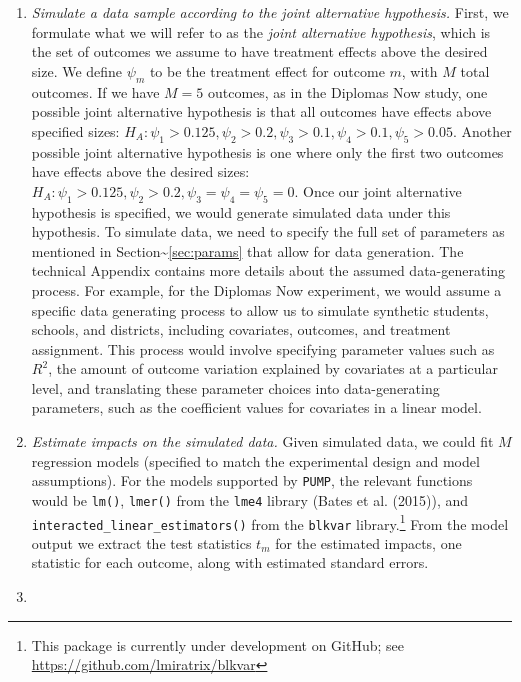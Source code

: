 \documentclass[
]{article}
\begin{document}
\begin{enumerate}
\def\labelenumi{\arabic{enumi}.}
\item
  \emph{Simulate a data sample according to the joint alternative
  hypothesis.} First, we formulate what we will refer to as the
  \emph{joint alternative hypothesis}, which is the set of outcomes we
  assume to have treatment effects above the desired size. We define
  \(\psi_m\) to be the treatment effect for outcome \(m\), with \(M\)
  total outcomes. If we have \(M = 5\) outcomes, as in the Diplomas Now
  study, one possible joint alternative hypothesis is that all outcomes
  have effects above specified sizes:
  \(H_A: \psi_1 > 0.125, \psi_2 > 0.2, \psi_3 > 0.1, \psi_4 > 0.1, \psi_5 > 0.05\).
  Another possible joint alternative hypothesis is one where only the
  first two outcomes have effects above the desired sizes:
  \(H_A: \psi_1 > 0.125, \psi_2 > 0.2, \psi_3 = \psi_4 = \psi_5 = 0\).
  Once our joint alternative hypothesis is specified, we would generate
  simulated data under this hypothesis. To simulate data, we need to
  specify the full set of parameters as mentioned in
  Section\textasciitilde{}\ref{sec:params} that allow for data
  generation. The technical Appendix contains more details about the
  assumed data-generating process. For example, for the Diplomas Now
  experiment, we would assume a specific data generating process to
  allow us to simulate synthetic students, schools, and districts,
  including covariates, outcomes, and treatment assignment. This process
  would involve specifying parameter values such as \(R^2\), the amount
  of outcome variation explained by covariates at a particular level,
  and translating these parameter choices into data-generating
  parameters, such as the coefficient values for covariates in a linear
  model.
\item
  \emph{Estimate impacts on the simulated data.} Given simulated data,
  we could fit \(M\) regression models (specified to match the
  experimental design and model assumptions). For the models supported
  by \texttt{PUMP}, the relevant functions would be \texttt{lm()},
  \texttt{lmer()} from the \texttt{lme4} library (Bates et al. (2015)),
  and \texttt{interacted\_linear\_estimators()} from the \texttt{blkvar}
  library.\footnote{This package is currently under development on GitHub; see \url{https://github.com/lmiratrix/blkvar}}
  From the model output we extract the test statistics \(t_m\) for the
  estimated impacts, one statistic for each outcome, along with
  estimated standard errors.
\item

\end{enumerate}
\end{document}
